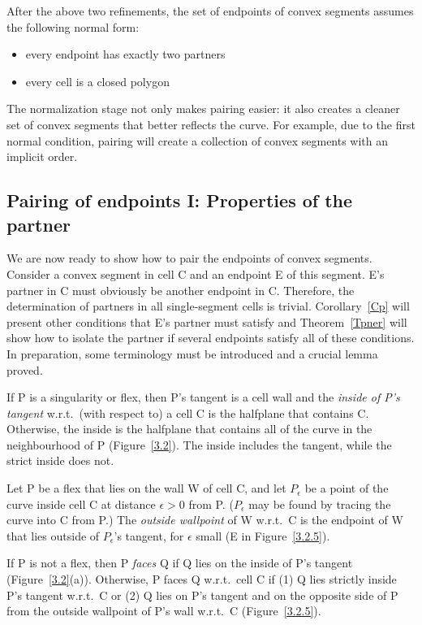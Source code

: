 After the above two refinements, the set of endpoints of convex segments 
assumes the following normal form:
\clearpage
\begin{itemize}
\item
	 every endpoint has exactly two partners
\nopagebreak
\item
	 every cell is a closed polygon
\end{itemize}
The normalization stage not only makes pairing easier: it also creates 
a cleaner set of convex segments that better reflects the curve.
For example, due to the first normal condition, pairing will create 
a collection of convex segments with an implicit order.


\subsection{Pairing of endpoints I: Properties of the partner}
\label{ssp}

We are now ready to show how to pair the endpoints of convex segments.
Consider a convex segment in cell C and an endpoint E of this segment.
E's partner in C must obviously be another endpoint in C.
Therefore, the determination of partners in all single-segment cells is trivial.
Corollary~\ref{Cp} will present other conditions that E's partner must satisfy
and Theorem~\ref{Tpner} will show how to isolate the partner if several endpoints
satisfy all of these conditions.
In preparation, some terminology must be introduced and a crucial lemma proved.
%
\begin{definition}

If P is a singularity or flex, then P's tangent is a cell wall and the 
{\em inside of P's tangent} w.r.t.\ (with respect to) a cell C is the 
halfplane that contains C.  Otherwise, the inside is the halfplane that 
contains all of the curve in the neighbourhood of P (Figure~\ref{3.2}).
The inside includes the tangent, while the strict inside does not.

Let P be a flex that lies on the wall W of cell C, and 
let $P_{\epsilon}$ be a point of the curve inside cell C at distance
$\epsilon > 0$ from P.
($P_{\epsilon}$ may be found by tracing the curve into C from P.)
The {\em outside wallpoint} of W w.r.t.\ C is the endpoint of W that 
lies outside of $P_{\epsilon}$'s tangent, for $\epsilon$ small (E in Figure~\ref{3.2.5}).

If P is not a flex, then P {\em faces} Q if Q lies on the inside of 
P's tangent (Figure~\ref{3.2}(a)).
Otherwise, P faces Q w.r.t.\ cell C if (1) Q lies strictly inside P's tangent 
w.r.t.\ C or (2) Q lies on P's tangent and on the opposite side of P from 
the outside wallpoint of P's wall w.r.t.\ C (Figure~\ref{3.2.5}).
\end{definition}

